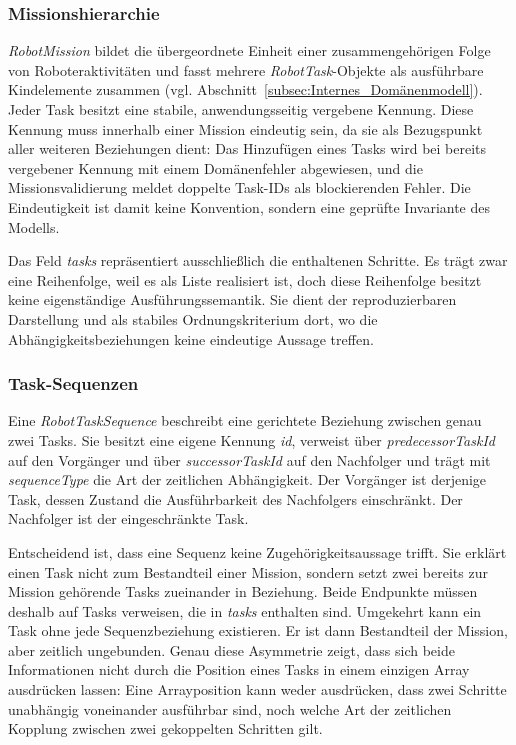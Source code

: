 \subsubsection{Missionshierarchie}
\textit{RobotMission} bildet die übergeordnete Einheit einer zusammengehörigen Folge von
Roboteraktivitäten und fasst mehrere \textit{RobotTask}-Objekte als ausführbare Kindelemente
zusammen (vgl. Abschnitt~\ref{subsec:Internes_Domänenmodell}). Jeder Task besitzt eine stabile, anwendungsseitig vergebene Kennung.
Diese Kennung muss innerhalb einer Mission eindeutig sein, da sie als Bezugspunkt aller weiteren
Beziehungen dient: Das Hinzufügen eines Tasks wird bei bereits vergebener Kennung mit einem
Domänenfehler abgewiesen, und die Missionsvalidierung meldet doppelte Task-IDs als blockierenden
Fehler. Die Eindeutigkeit ist damit keine Konvention, sondern eine geprüfte Invariante des Modells.

Das Feld \textit{tasks} repräsentiert ausschließlich die enthaltenen Schritte. Es trägt zwar eine
Reihenfolge, weil es als Liste realisiert ist, doch diese Reihenfolge besitzt keine eigenständige
Ausführungssemantik. Sie dient der reproduzierbaren Darstellung und als stabiles Ordnungskriterium
dort, wo die Abhängigkeitsbeziehungen keine eindeutige Aussage treffen.


\subsubsection{Task-Sequenzen}
Eine \textit{RobotTaskSequence} beschreibt eine gerichtete Beziehung zwischen genau zwei Tasks. Sie
besitzt eine eigene Kennung \textit{id}, verweist über \textit{predecessorTaskId} auf den Vorgänger
und über \textit{successorTaskId} auf den Nachfolger und trägt mit \textit{sequenceType} die Art der
zeitlichen Abhängigkeit. Der Vorgänger ist derjenige Task, dessen Zustand die Ausführbarkeit des
Nachfolgers einschränkt. Der Nachfolger ist der eingeschränkte Task.

Entscheidend ist, dass eine Sequenz keine Zugehörigkeitsaussage trifft. Sie erklärt einen Task nicht
zum Bestandteil einer Mission, sondern setzt zwei bereits zur Mission gehörende Tasks zueinander in
Beziehung. Beide Endpunkte müssen deshalb auf Tasks verweisen, die in \textit{tasks} enthalten sind.
Umgekehrt kann ein Task ohne jede Sequenzbeziehung existieren. Er ist dann Bestandteil der Mission,
aber zeitlich ungebunden. Genau diese Asymmetrie zeigt, dass sich beide Informationen nicht durch
die Position eines Tasks in einem einzigen Array ausdrücken lassen: Eine Arrayposition kann weder
ausdrücken, dass zwei Schritte unabhängig voneinander ausführbar sind, noch welche Art der
zeitlichen Kopplung zwischen zwei gekoppelten Schritten gilt.

